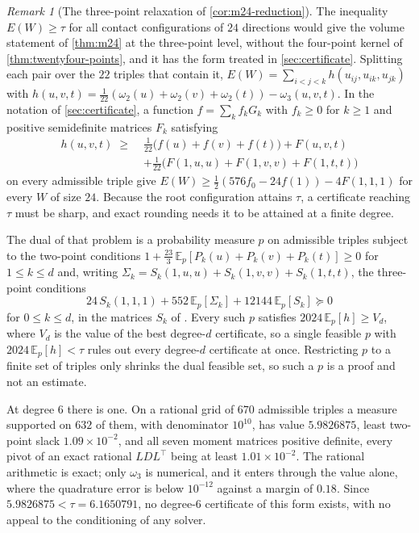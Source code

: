 \documentclass[11pt,reqno]{amsart}
\renewcommand{\_}{\origunderscore\allowbreak}
\numberwithin{equation}{section}
\theoremstyle{plain}
\theoremstyle{definition}
\theoremstyle{remark}
\newtheorem{remark}[thm]{Remark}
\begin{document}
\begin{remark}[The three-point relaxation of \cref{cor:m24-reduction}]\label{rem:m24-three-point}
The inequality $E(W)\ge\tau$ for all contact configurations of $24$
directions would give the volume statement of \cref{thm:m24} at the three-point
level, without the four-point kernel of \cref{thm:twentyfour-points},
and it has the form treated in \cref{sec:certificate}.
Splitting each pair over the $22$ triples that contain it,
$E(W)=\sum_{i<j<k}h(u_{ij},u_{ik},u_{jk})$ with
$h(u,v,t)=\tfrac1{22}(\omega_2(u)+\omega_2(v)+\omega_2(t))-\omega_3(u,v,t)$.
In the notation of \cref{sec:certificate}, a function
$f=\sum_kf_kG_k$ with $f_k\ge0$ for $k\ge1$ and positive semidefinite
matrices $F_k$ satisfying
\begin{align*}
  h(u,v,t)\;\ge\;&\tfrac1{22}\bigl(f(u)+f(v)+f(t)\bigr)+F(u,v,t)\\
  &+\tfrac1{22}\bigl(F(1,u,u)+F(1,v,v)+F(1,t,t)\bigr)
\end{align*}
on every admissible triple give $E(W)\ge\tfrac12(576f_0-24f(1))-4F(1,1,1)$
for every $W$ of size $24$. Because the root configuration attains $\tau$,
a certificate reaching $\tau$ must be sharp, and exact rounding needs it
to be attained at a finite degree.

The dual of that problem is a probability measure $p$ on admissible
triples subject to the two-point conditions
$1+\tfrac{23}{3}\,\mathbb{E}_p[P_k(u)+P_k(v)+P_k(t)]\ge0$ for
$1\le k\le d$ and, writing
$\Sigma_k=S_k(1,u,u)+S_k(1,v,v)+S_k(1,t,t)$, the three-point conditions
\[
  24\,S_k(1,1,1)+552\,\mathbb{E}_p[\Sigma_k]
  +12144\,\mathbb{E}_p[S_k]\succeq0
\]
for $0\le k\le d$, in the matrices $S_k$ of \cite{BV08}. Every such $p$
satisfies $2024\,\mathbb{E}_p[h]\ge V_d$, where $V_d$ is the value of the
best degree-$d$ certificate, so a single feasible $p$ with
$2024\,\mathbb{E}_p[h]<\tau$ rules out every degree-$d$ certificate at
once. Restricting $p$ to a finite set of triples only shrinks the dual
feasible set, so such a $p$ is a proof and not an estimate.

At degree $6$ there is one. On a rational grid of $670$ admissible
triples a measure supported on $632$ of them, with denominator
$10^{10}$, has value $5.9826875$, least two-point slack
$1.09\times10^{-2}$, and all seven moment matrices positive definite,
every pivot of an exact rational $LDL^\top$ being at least
$1.01\times10^{-2}$. The rational arithmetic is exact; only $\omega_3$
is numerical, and it enters through the value alone, where the
quadrature error is below $10^{-12}$ against a margin of $0.18$. Since
$5.9826875<\tau=6.1650791$, no degree-$6$ certificate of this form
exists, with no appeal to the conditioning of any solver.


\end{remark}
\end{document}
